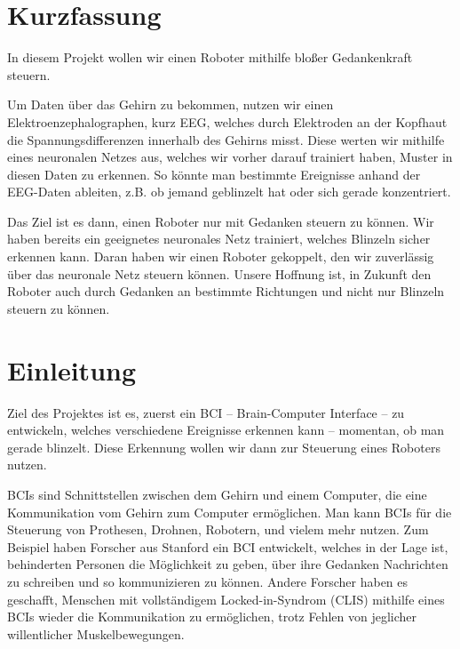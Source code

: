 \documentclass[11pt]{scrartcl}
\begin{document}
	\newpage

	
	\tableofcontents
	
	\newpage

	\section{Kurzfassung}


	In diesem Projekt wollen wir einen Roboter mithilfe bloßer Gedankenkraft steuern.

	Um Daten über das Gehirn zu bekommen, nutzen wir einen Elektroenzephalographen, kurz EEG, welches durch Elektroden an der Kopfhaut die Spannungsdifferenzen innerhalb des Gehirns misst. Diese werten wir mithilfe eines neuronalen Netzes aus, welches wir vorher darauf trainiert haben, Muster in diesen Daten zu erkennen. So könnte man bestimmte Ereignisse anhand der EEG-Daten ableiten, z.B. ob jemand geblinzelt hat oder sich gerade konzentriert.
	
	Das Ziel ist es dann, einen Roboter nur mit Gedanken steuern zu können.
	Wir haben bereits ein geeignetes neuronales Netz trainiert, welches Blinzeln sicher erkennen kann. 
	Daran haben wir einen Roboter gekoppelt, den wir zuverlässig über das neuronale Netz steuern können.
	Unsere Hoffnung ist, in Zukunft den Roboter auch durch Gedanken an bestimmte Richtungen und nicht nur Blinzeln steuern zu können.

	\section{Einleitung}

	Ziel des Projektes ist es, zuerst ein BCI -- Brain-Computer Interface -- zu entwickeln, welches verschiedene Ereignisse erkennen kann -- momentan, ob man gerade blinzelt. Diese Erkennung wollen wir dann zur Steuerung eines Roboters nutzen.

	BCIs sind Schnittstellen zwischen dem Gehirn und einem Computer, die eine Kommunikation vom Gehirn zum Computer ermöglichen. Man kann BCIs für die Steuerung von Prothesen, Drohnen, Robotern, und vielem mehr nutzen. \cite{bci-explained}
	Zum Beispiel haben Forscher aus Stanford ein BCI entwickelt, welches in der Lage ist, behinderten Personen die Möglichkeit zu geben, über ihre Gedanken Nachrichten zu schreiben und so kommunizieren zu können. \cite{brain2text}
	Andere Forscher haben es geschafft, Menschen mit vollständigem Locked-in-Syndrom (CLIS) mithilfe eines BCIs wieder die Kommunikation zu ermöglichen, trotz Fehlen von jeglicher willentlicher Muskelbewegungen. \cite{BCIChaudhary}
	
\end{document}

